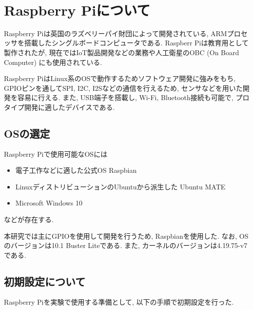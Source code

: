 \
\section{Raspberry Piについて}\label{about-raspberry}

Raspberry Piは英国のラズベリーパイ財団によって開発されている, ARMプロセッサを搭載したシングルボードコンピュータである. Raspberr
Piは教育用として製作されたが, 現在ではIoT製品開発などの業務や人工衛星のOBC (On Board Computer) にも使用されている. 

Raspberry PiはLinux系のOSで動作するためソフトウェア開発に強みをもち, GPIOピンを通してSPI, I2C, I2Sなどの通信を行えるため, センサなどを用いた開発を容易に行える. また, USB端子を搭載し, Wi-Fi, Bluetooth接続も可能で, プロタイプ開発に適したデバイスである. 

\subsection{OSの選定}\label{choose-os}

Raspberry Piで使用可能なOSには

\begin{itemize}
\tightlist
\item
  電子工作などに適した公式OS Raspbian
\item
  LinuxディストリビューションのUbuntuから派生した Ubuntu MATE
\item
  Microsoft Windows 10
\end{itemize}

などが存在する. 

本研究では主にGPIOを使用して開発を行うため, Raspbianを使用した. なお, OSのバージョンは10.1
Buster Liteである. また, カーネルのバージョンは4.19.75-v7である. 

\subsection{初期設定について}\label{about-setup}

Raspberry Piを実験で使用する準備として, 以下の手順で初期設定を行った. 

